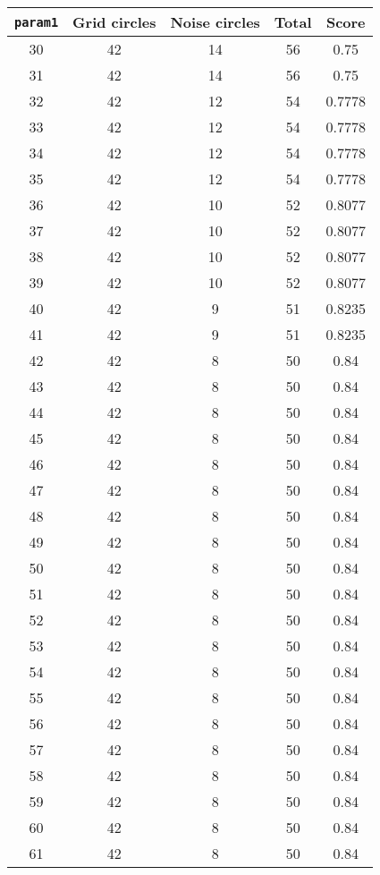 \documentclass[letterpaper, 12pt]{article}
\begin{document}
\begin{longtable}{|c|c|c|c|c|}
\hline
\textbf{\texttt{param1}} & \textbf{Grid circles} & \textbf{Noise circles} & \textbf{Total} & \textbf{Score} \\
\hline
30 & 42 & 14 & 56 & 0.75 \\
\hline
31 & 42 & 14 & 56 & 0.75 \\
\hline
32 & 42 & 12 & 54 & 0.7778 \\
\hline
33 & 42 & 12 & 54 & 0.7778 \\
\hline
34 & 42 & 12 & 54 & 0.7778 \\
\hline
35 & 42 & 12 & 54 & 0.7778 \\
\hline
36 & 42 & 10 & 52 & 0.8077 \\
\hline
37 & 42 & 10 & 52 & 0.8077 \\
\hline
38 & 42 & 10 & 52 & 0.8077 \\
\hline
39 & 42 & 10 & 52 & 0.8077 \\
\hline
40 & 42 & 9 & 51 & 0.8235 \\
\hline
41 & 42 & 9 & 51 & 0.8235 \\
\hline
42 & 42 & 8 & 50 & 0.84 \\
\hline
43 & 42 & 8 & 50 & 0.84 \\
\hline
44 & 42 & 8 & 50 & 0.84 \\
\hline
45 & 42 & 8 & 50 & 0.84 \\
\hline
46 & 42 & 8 & 50 & 0.84 \\
\hline
47 & 42 & 8 & 50 & 0.84 \\
\hline
48 & 42 & 8 & 50 & 0.84 \\
\hline
49 & 42 & 8 & 50 & 0.84 \\
\hline
50 & 42 & 8 & 50 & 0.84 \\
\hline
51 & 42 & 8 & 50 & 0.84 \\
\hline
52 & 42 & 8 & 50 & 0.84 \\
\hline
53 & 42 & 8 & 50 & 0.84 \\
\hline
54 & 42 & 8 & 50 & 0.84 \\
\hline
55 & 42 & 8 & 50 & 0.84 \\
\hline
56 & 42 & 8 & 50 & 0.84 \\
\hline
57 & 42 & 8 & 50 & 0.84 \\
\hline
58 & 42 & 8 & 50 & 0.84 \\
\hline
59 & 42 & 8 & 50 & 0.84 \\
\hline
60 & 42 & 8 & 50 & 0.84 \\
\hline
61 & 42 & 8 & 50 & 0.84 \\

\end{longtable}
\end{document}
